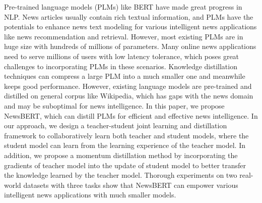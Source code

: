Pre-trained language models (PLMs) like BERT have made great progress in NLP. News articles usually contain rich textual information, and PLMs have the potentials to enhance news text modeling for various intelligent news applications like news recommendation and retrieval. However, most existing PLMs are in huge size with hundreds of millions of parameters. Many online news applications need to serve millions of users with low latency tolerance, which poses great challenges to incorporating PLMs in these scenarios. Knowledge distillation techniques can compress a large PLM into a much smaller one and meanwhile keeps good performance. However, existing language models are pre-trained and distilled on general corpus like Wikipedia, which has gaps with the news domain and may be suboptimal for news intelligence. In this paper, we propose NewsBERT, which can distill PLMs for efficient and effective news intelligence. In our approach, we design a teacher-student joint learning and distillation framework to collaboratively learn both teacher and student models, where the student model can learn from the learning experience of the teacher model. In addition, we propose a momentum distillation method by incorporating the gradients of teacher model into the update of student model to better transfer the knowledge learned by the teacher model. Thorough experiments on two real-world datasets with three tasks show that NewsBERT can empower various intelligent news applications with much smaller models.
